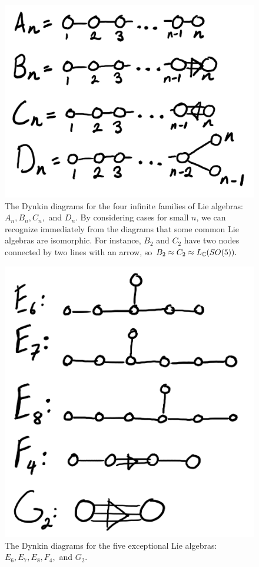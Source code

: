 \begin{figure}
    \centering
    \includegraphics{2018/11/20181117_cartan1.png}
    \caption{The Dynkin diagrams for the four infinite families of Lie algebras: $A_n,B_n,C_n,$ and $D_n$. By considering cases for small $n$, we can recognize immediately from the diagrams that some common Lie algebras are isomorphic. For instance, $B_2$ and $C_2$ have two nodes connected by two lines with an arrow, so $B_2\approx C_2 \approx L_{\mathbb{C}}(SO(5)).$}
    \label{fig:dynkin1}
\end{figure}

\begin{figure}
    \centering
    \includegraphics{2018/11/20181117_cartan2.png}
    \caption{The Dynkin diagrams for the five exceptional Lie algebras: $E_6,E_7,E_8,F_4,$ and $G_2$.}
    \label{fig:dynkin2}
\end{figure}

